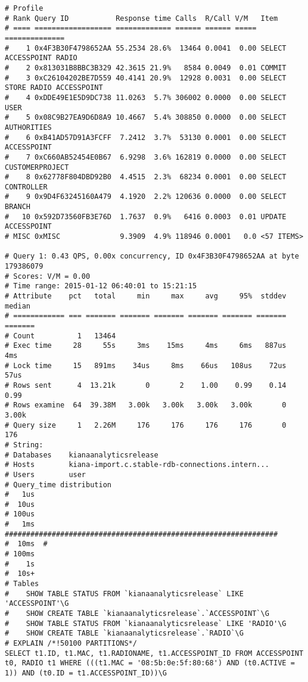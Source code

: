 \begin{appendix}
\begin{footnotesize}
\begin{verbatim}
# Profile
# Rank Query ID           Response time Calls  R/Call V/M   Item
# ==== ================== ============= ====== ====== ===== ==============
#    1 0x4F3B30F4798652AA 55.2534 28.6%  13464 0.0041  0.00 SELECT ACCESSPOINT RADIO
#    2 0x813031B8BBC3B329 42.3615 21.9%   8584 0.0049  0.01 COMMIT
#    3 0xC26104202BE7D559 40.4141 20.9%  12928 0.0031  0.00 SELECT STORE RADIO ACCESSPOINT
#    4 0xDDE49E1E5D9DC738 11.0263  5.7% 306002 0.0000  0.00 SELECT USER
#    5 0x08C9B27EA9D6D8A9 10.4667  5.4% 308850 0.0000  0.00 SELECT AUTHORITIES
#    6 0xB41AD57D91A3FCFF  7.2412  3.7%  53130 0.0001  0.00 SELECT ACCESSPOINT
#    7 0xC660AB52454E0B67  6.9298  3.6% 162819 0.0000  0.00 SELECT CUSTOMERPROJECT
#    8 0x62778F804DBD92B0  4.4515  2.3%  68234 0.0001  0.00 SELECT CONTROLLER
#    9 0x9D4F63245160A479  4.1920  2.2% 120636 0.0000  0.00 SELECT BRANCH
#   10 0x592D73560FB3E76D  1.7637  0.9%   6416 0.0003  0.01 UPDATE ACCESSPOINT
# MISC 0xMISC              9.3909  4.9% 118946 0.0001   0.0 <57 ITEMS>

# Query 1: 0.43 QPS, 0.00x concurrency, ID 0x4F3B30F4798652AA at byte 179386079
# Scores: V/M = 0.00
# Time range: 2015-01-12 06:40:01 to 15:21:15
# Attribute    pct   total     min     max     avg     95%  stddev  median
# ============ === ======= ======= ======= ======= ======= ======= =======
# Count          1   13464
# Exec time     28     55s     3ms    15ms     4ms     6ms   887us     4ms
# Lock time     15   891ms    34us     8ms    66us   108us    72us    57us
# Rows sent      4  13.21k       0       2    1.00    0.99    0.14    0.99
# Rows examine  64  39.38M   3.00k   3.00k   3.00k   3.00k       0   3.00k
# Query size     1   2.26M     176     176     176     176       0     176
# String:
# Databases    kianaanalyticsrelease
# Hosts        kiana-import.c.stable-rdb-connections.intern...
# Users        user
# Query_time distribution
#   1us
#  10us
# 100us
#   1ms  ################################################################
#  10ms  #
# 100ms
#    1s
#  10s+
# Tables
#    SHOW TABLE STATUS FROM `kianaanalyticsrelease` LIKE 'ACCESSPOINT'\G
#    SHOW CREATE TABLE `kianaanalyticsrelease`.`ACCESSPOINT`\G
#    SHOW TABLE STATUS FROM `kianaanalyticsrelease` LIKE 'RADIO'\G
#    SHOW CREATE TABLE `kianaanalyticsrelease`.`RADIO`\G
# EXPLAIN /*!50100 PARTITIONS*/
SELECT t1.ID, t1.MAC, t1.RADIONAME, t1.ACCESSPOINT_ID FROM ACCESSPOINT t0, RADIO t1 WHERE (((t1.MAC = '08:5b:0e:5f:80:68') AND (t0.ACTIVE = 1)) AND (t0.ID = t1.ACCESSPOINT_ID))\G


\end{verbatim}
\end{footnotesize}
\end{appendix}
